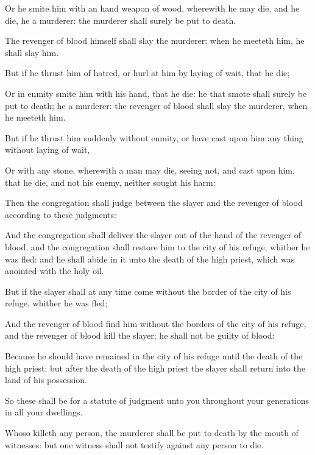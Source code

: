 {Or
{} he
smite him with an
hand
weapon of
wood, wherewith he may
die, and he
die, he
{} a
murderer: the
murderer shall
surely be put to
death.

The
revenger of
blood himself shall
slay the
murderer: when he
meeteth him,
he shall
slay him.

But if he
thrust him of
hatred, or
hurl at him by laying of
wait, that he
die;

Or in
enmity
smite him with his
hand, that he
die: he that
smote
{} shall
surely be put to
death;
{} he
{} a
murderer: the
revenger of
blood shall
slay the
murderer, when he
meeteth him.

But if he
thrust him
suddenly
without
enmity, or have
cast upon him any
thing without laying of
wait,

Or with any
stone, wherewith a man may
die,
seeing
{}
not, and
cast
{} upon him, that he
die, and
{} not his
enemy, neither
sought his
harm:

Then the
congregation shall
judge between the
slayer and the
revenger of
blood according to these
judgments:

And the
congregation shall
deliver the
slayer out of the
hand of the
revenger of
blood, and the
congregation shall
restore him to the
city of his
refuge, whither he was
fled: and he shall
abide in it unto the
death of the
high
priest, which was
anointed with the
holy
oil.

But if the
slayer shall at any
time
come without the
border of the
city of his
refuge, whither he was
fled;

And the
revenger of
blood
find him
without the
borders of the
city of his
refuge, and the
revenger of
blood
kill the
slayer; he shall not be guilty of
blood:

Because he should have
remained in the
city of his
refuge until the
death of the
high
priest: but
after the
death of the
high
priest the
slayer shall
return into the
land of his
possession.

So these
{} shall be for a
statute of
judgment unto you throughout your
generations in all your
dwellings.

Whoso
killeth any
person, the
murderer shall be put to
death by the
mouth of
witnesses: but
one
witness shall not
testify against any
person
{} to
die.

}
